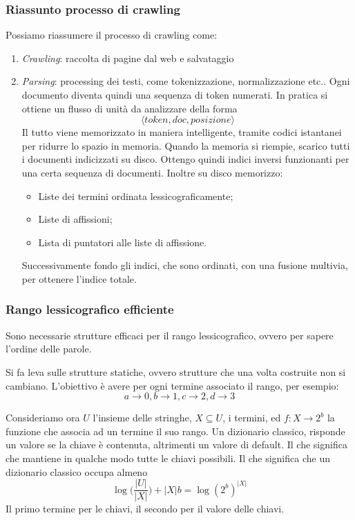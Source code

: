 \subsubsection{Riassunto processo di crawling}
Possiamo riassumere il processo di crawling come: 
\begin{enumerate}
    \item \emph{Crawling}: raccolta di pagine dal web e salvataggio
    \item \emph{Parsing}: processing dei testi, come tokenizzazione, 
    normalizzazione etc.. Ogni documento diventa quindi una sequenza di 
    token numerati. In 
    pratica si ottiene un flusso di unità da analizzare della forma 
    $$\langle\mathit{token}, \mathit{doc}, \mathit{posizione}\rangle$$
    Il tutto viene memorizzato in maniera intelligente, tramite codici 
    istantanei per ridurre lo spazio in memoria.
    Quando la memoria si riempie, scarico tutti i documenti indicizzati 
    su disco. Ottengo quindi indici inversi funzionanti per una certa 
    sequenza di documenti.
    Inoltre su disco memorizzo: 
    \begin{itemize}
        \item Liste dei termini ordinata lessicograficamente;
        \item Liste di affissioni;
        \item Lista di puntatori alle liste di affissione.
    \end{itemize}
    Successivamente fondo gli indici, che sono ordinati, con una fusione
    multivia, per ottenere l'indice totale.
\end{enumerate}

\subsubsection{Rango lessicografico efficiente}

Sono necessarie strutture efficaci per il rango lessicografico, ovvero 
per sapere l'ordine delle parole.

Si fa leva sulle strutture statiche, ovvero strutture che una volta costruite
non si cambiano. 
L'obiettivo è avere per ogni termine associato il rango, per esempio: 
\begin{equation}
    a \longrightarrow 0,
    b \longrightarrow 1,
    c \longrightarrow 2,
    d \longrightarrow 3
\end{equation}

Consideriamo ora $U$ l'insieme delle stringhe, $X \subseteq U$, i termini,
ed $f : X \longrightarrow 2^b$ la funzione che associa ad un termine il 
suo rango.
Un dizionario classico, risponde un valore se la chiave è contenuta, 
altrimenti un valore di default. Il che significa che mantiene in qualche modo 
tutte le chiavi possibili. Il che significa che un dizionario 
classico occupa almeno $$\log\bigg( \frac{|U|}{|X|} \bigg) + |X|b = \log(2^b)^{|X|}$$
Il primo termine per le chiavi, il secondo per il valore delle chiavi.

